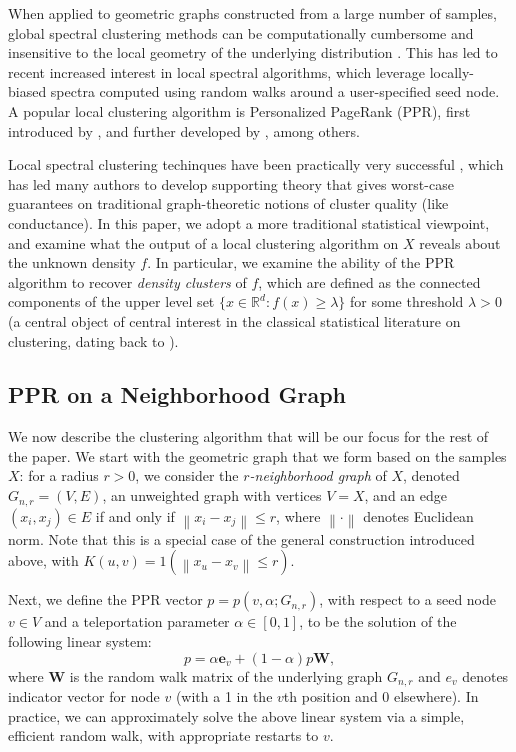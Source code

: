 \documentclass{article}
\newcommand{\Reals}{\mathbb{R}}
\newcommand{\Rd}{\Reals^d}
\newcommand{\norm}[1]{\left\lVert#1\right\rVert}
\newcommand{\1}{\mathbf{1}}
\newcommand{\pbf}{p}        %
\newcommand{\ebf}[1]{\mathbf{e}_{#1}}
\newcommand{\Xbf}{X}             %
\newcommand{\Wbf}{\mathbf{W}}
\theoremstyle{aldenthm}
\theoremstyle{aldenrmrk}
\begin{document}
When applied to geometric graphs constructed from a large number of samples,
global spectral clustering methods can be computationally cumbersome and   
insensitive to the local geometry of the underlying distribution
\citep{leskovec2010,mahoney2012}.  This has led to recent increased interest in
local spectral algorithms, which leverage locally-biased spectra computed using
random walks around a user-specified seed node.  A popular local clustering
algorithm is Personalized PageRank (PPR), first introduced by
\citep{haveliwala2003}, and further developed by
\citep{spielman2011,spielman2014,andersen2006,mahoney2012,zhu2013},
among others.  

Local spectral clustering techinques have been practically very successful
\citep{leskovec2010,andersen2012,gleich2012,mahoney2012,wu2012}, which has led
many authors to develop supporting theory
\citep{spielman2013,andersen2009,gharan2012,zhu2013} that gives worst-case
guarantees on traditional graph-theoretic notions of cluster quality (like
conductance).  In this paper, we adopt a more traditional statistical viewpoint,
and examine what the output of a local clustering algorithm on $\Xbf$ reveals
about the unknown density $f$.  In particular, we examine the ability of the PPR
algorithm to recover \emph{density clusters} of $f$, which are defined as the
connected components of the upper level set $\{x \in \Rd : f(x) \geq \lambda\}$
for some threshold $\lambda > 0$ (a central object of central interest in the
classical statistical literature on clustering, dating back to
\citet{hartigan1981}).

\subsection{PPR on a Neighborhood Graph}

We now describe the clustering algorithm that will be our focus for the rest of 
the paper. We start with the geometric graph that we form based on the samples 
$\Xbf$: for a radius $r > 0$, we consider the \emph{$r$-neighborhood graph} of 
$\Xbf$, denoted $G_{n,r}=(V,E)$, an unweighted graph with vertices
$V=\Xbf$, and an edge $(x_i,x_j) \in E$ if and only if $\norm{x_i - x_j}
\leq  r$, where $\norm{\cdot}$ denotes Euclidean norm.  Note that this is a
special case of the general construction introduced above, with 
$K(u,v) = 1(\norm{x_u - x_v} \leq r)$. 

Next, we define the PPR vector $\pbf = \pbf(v,\alpha;G_{n,r})$, with respect to  
a seed node $v \in V$ and a teleportation parameter $\alpha \in [0,1]$, to be
the solution of the following linear system:
\begin{equation}
\label{eqn: ppr_vector}
\pbf = \alpha \ebf{v} + (1 - \alpha) \pbf \Wbf,
\end{equation}
where $\Wbf$ is the random walk matrix of the underlying graph $G_{n,r}$ 
and $e_{v}$ denotes indicator vector for node $v$ (with a 1 in the $v$th
position and 0 elsewhere).  In practice, we can approximately solve the above
linear system via a simple, efficient random walk, with appropriate restarts to
$v$. 
\end{document}
